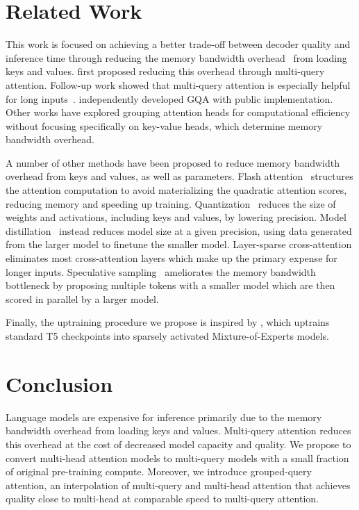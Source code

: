 \documentclass[11pt]{article}
\begin{document}
\section{Related Work}

This work is focused on achieving a better trade-off between decoder quality and inference time through reducing the memory bandwidth overhead~\citep{roofline} from loading keys and values. \citet{shazeer2019mq} first proposed reducing this overhead through multi-query attention. Follow-up work showed that multi-query attention is especially helpful for long inputs~\citep{palminference, dejong2022fido}. \citet{gqamrabe} independently developed GQA with public implementation. Other works have explored grouping attention heads for computational efficiency~\citep{grouptrans, gmha, pillars} without focusing specifically on key-value heads, which determine memory bandwidth overhead.

A number of other methods have been proposed to reduce memory bandwidth overhead from keys and values, as well as parameters. Flash attention~\citep{flashattention} structures the attention computation to avoid materializing the quadratic attention scores, reducing memory and speeding up training. Quantization~\citep{int8, gptq} reduces the size of weights and activations, including keys and values, by lowering precision. Model distillation~\citep{distill, distillsurvey} instead reduces model size at a given precision, using data generated from the larger model to finetune the smaller model. Layer-sparse cross-attention \citep{dejong2022fido} eliminates most cross-attention layers which make up the primary expense for longer inputs. Speculative sampling~\citep{specchen, specleviathan} ameliorates the memory bandwidth bottleneck by proposing multiple tokens with a smaller model which are then scored in parallel by a larger model. 

Finally, the uptraining procedure we propose is inspired by \citet{sparsemoe}, which uptrains standard T5 checkpoints into sparsely activated Mixture-of-Experts models.

\label{section:related}

\section{Conclusion}
\label{section:conclusion}

Language models are expensive for inference primarily due to the memory bandwidth overhead from loading keys and values. Multi-query attention reduces this overhead at the cost of decreased model capacity and quality. We propose to convert multi-head attention models to multi-query models with a small fraction of original pre-training compute. Moreover, we introduce grouped-query attention, an interpolation of multi-query and multi-head attention that achieves quality close to multi-head at comparable speed to multi-query attention. 
\end{document}
